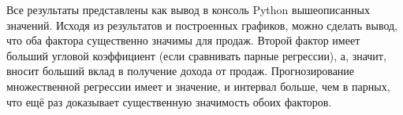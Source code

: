 Все результаты представлены как вывод в консоль Python вышеописанных значений. Исходя из результатов и построенных графиков, можно сделать вывод, что оба фактора существенно значимы для продаж. Второй фактор имеет больший угловой коэффициент (если сравнивать парные регрессии), а, значит, вносит больший вклад в получение дохода от продаж. Прогнозирование множественной регрессии имеет и значение, и интервал больше, чем в парных, что ещё раз доказывает существенную значимость обоих факторов.

